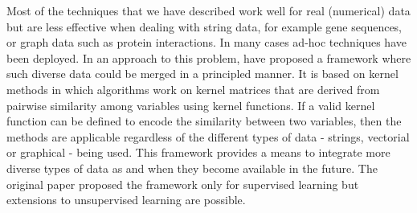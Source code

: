 Most of the techniques that we have described work well for real (numerical) data but are less effective when dealing with string data, for example gene sequences, or graph data such as protein interactions. In many cases ad-hoc techniques have been deployed. In an approach to this problem, \citet{lanck04statframework} have proposed a framework where such diverse data could be merged in a principled manner. It is based on kernel methods \citep{johnshaw2004kernelmethods} in which algorithms work on kernel matrices that are derived from pairwise similarity among variables using kernel functions. If a valid kernel function can be defined to encode the similarity between two variables, then the methods are applicable regardless of the different types of data - strings, vectorial or graphical - being used. This framework provides a means to integrate more diverse types of data as and when they become available in the future. The original paper proposed the framework only for supervised learning but extensions to unsupervised learning are possible. 

